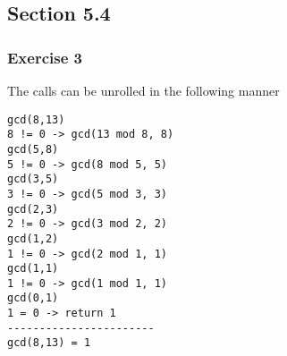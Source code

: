 \documentclass[a4paper]{article}
\newcommand{\ex}[1]{\subsubsection*{#1}}
\begin{document}
\subsection*{Section 5.4}
\ex{Exercise 3}

The calls can be unrolled in the following manner

\begin{verbatim}
gcd(8,13)
8 != 0 -> gcd(13 mod 8, 8)
gcd(5,8)
5 != 0 -> gcd(8 mod 5, 5)
gcd(3,5)
3 != 0 -> gcd(5 mod 3, 3)
gcd(2,3)
2 != 0 -> gcd(3 mod 2, 2)
gcd(1,2)
1 != 0 -> gcd(2 mod 1, 1)
gcd(1,1)
1 != 0 -> gcd(1 mod 1, 1)
gcd(0,1)
1 = 0 -> return 1
-----------------------
gcd(8,13) = 1
\end{verbatim}

%
\end{document}
